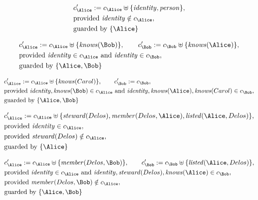 \begin{align*}
&
c'_
{
\Alice
}
 := 
c_
{
\Alice
}
 \uplus 
\{
\mathit{
identity
}
,
\mathit{
person
}
\}
,\\
&
\text{provided } 
\mathit{
identity
}
 \notin c_
{
\Alice
}
,\\
&
\text{guarded by } \{
\Alice
\}
\end{align*}

\begin{align*}
&
c'_
{
\Alice
}
 := 
c_
{
\Alice
}
 \uplus 
\{
\mathit{
knows
}
(
\Bob
)
\}
, \qquad 
c'_
{
\Bob
}
 := 
c_
{
\Bob
}
 \uplus 
\{
\mathit{
knows
}
(
\Alice
)
\}
,\\
&
\text{provided } 
\mathit{
identity
}
 \in c_
{
\Alice
}
 \text{ and } 
\mathit{
identity
}
 \in c_
{
\Bob
}
,\\
&
\text{guarded by } \{
\Alice
,
\Bob
\}
\end{align*}

\begin{align*}
&
c'_
{
\Alice
}
 := 
c_
{
\Alice
}
 \uplus 
\{
\mathit{
knows
}
(
Carol
)
\}
, \qquad 
c'_
{
\Bob
}
 := 
c_
{
\Bob
}
,\\
&
\text{provided } 
\mathit{
identity
}
,
\mathit{
knows
}
(
\Bob
)
 \in c_
{
\Alice
}
 \text{ and } 
\mathit{
identity
}
,
\mathit{
knows
}
(
\Alice
)
,
\mathit{
knows
}
(
Carol
)
 \in c_
{
\Bob
}
,\\
&
\text{guarded by } \{
\Alice
,
\Bob
\}
\end{align*}

\begin{align*}
&
c'_
{
\Alice
}
 := 
c_
{
\Alice
}
 \uplus 
\{
\mathit{
steward
}
(
Delos
)
,
\mathit{
member
}
(
Delos
,
\Alice
)
,
\mathit{
listed
}
(
\Alice
,
Delos
)
\}
,\\
&
\text{provided } 
\mathit{
identity
}
 \in c_
{
\Alice
}
,\\
&
\text{provided } 
\mathit{
steward
}
(
Delos
)
 \notin c_
{
\Alice
}
,\\
&
\text{guarded by } \{
\Alice
\}
\end{align*}

\begin{align*}
&
c'_
{
\Alice
}
 := 
c_
{
\Alice
}
 \uplus 
\{
\mathit{
member
}
(
Delos
,
\Bob
)
\}
, \qquad 
c'_
{
\Bob
}
 := 
c_
{
\Bob
}
 \uplus 
\{
\mathit{
listed
}
(
\Alice
,
Delos
)
\}
,\\
&
\text{provided } 
\mathit{
identity
}
 \in c_
{
\Alice
}
 \text{ and } 
\mathit{
identity
}
,
\mathit{
steward
}
(
Delos
)
,
\mathit{
knows
}
(
\Alice
)
 \in c_
{
\Bob
}
,\\
&
\text{provided } 
\mathit{
member
}
(
Delos
,
\Bob
)
 \notin c_
{
\Alice
}
,\\
&
\text{guarded by } \{
\Alice
,
\Bob
\}
\end{align*}
